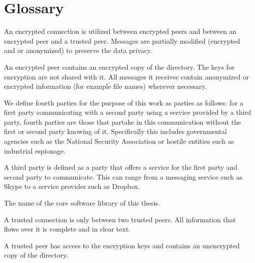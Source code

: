 \chapter{Glossary}
\label{chap:glossary}

\begin{description}[leftmargin=2em,style=nextline,noitemsep,nolistsep]
    \item[Encrypted Connection]
        An encrypted connection is utilized between encrypted peers and between an encrypted peer and a trusted peer.
        Messages are partially modified (encrypted and or anonymized) to preserve the data privacy.
    \item[Encrypted Peer]
        An encrypted peer contains an encrypted copy of the directory.
        The keys for encryption are not shared with it.
        All messages it receives contain anonymized or encrypted information (for example file names) wherever necessary.
    \item[Fourth Party]
        We define fourth parties for the purpose of this work as parties as follows: for a first party communicating with a second party using a service provided by a third party, fourth parties are those that partake in this communication without the first or second party knowing of it.
        Specifically this includes governmental agencies such as the National Security Association or hostile entities such as industrial espionage.
    \item[Third Party]
        A third party is defined as a party that offers a service for the first party and second party to communicate.
        This can range from a messaging service such as Skype to a service provider such as Dropbox.
    \item[Tinzenite]
        The name of the core software library of this thesis.
    \item[Trusted Connection]
        A trusted connection is only between two trusted peers.
        All information that flows over it is complete and in clear text.
    \item[Trusted Peer]
        A trusted peer has access to the encryption keys and contains an unencrypted copy of the directory.
\end{description}

